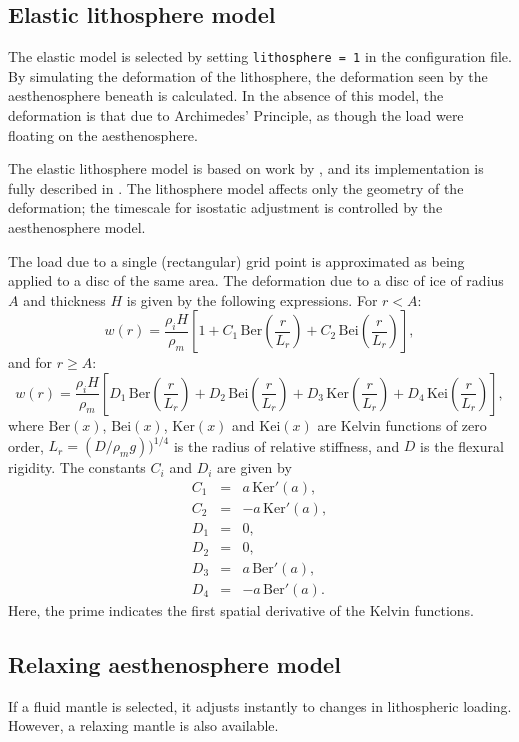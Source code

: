 \subsection{Elastic lithosphere model}
The elastic model is selected by setting \texttt{lithosphere = 1} in the
configuration file. By simulating the deformation of the lithosphere, the
deformation seen by the aesthenosphere beneath is calculated. In the absence of this
model, the deformation is that due to Archimedes' Principle, as though the
load were floating on the aesthenosphere.

The elastic lithosphere model is based on work by \cite{Lambeck1980}, and its
implementation is fully described in \cite{Hagdorn2003}. The lithosphere
model affects only the geometry of the deformation; the timescale for
isostatic adjustment is controlled by the aesthenosphere model. 

The load due to a single (rectangular) grid point is approximated as being
applied to a disc of the same area. The deformation due to a disc of ice of
radius $A$ and thickness $H$ is given by the following expressions. For $r<A$:
\begin{equation} 
w(r)=\frac{\rho_i H}{\rho_m}\left[1+C_1\,\mathrm{Ber}\left(\frac{r}{L_r}\right)+C_2\,\mathrm{Bei}\left(\frac{r}{L_r}\right)\right],
\end{equation}
and for $r\geq A$:
\begin{equation}
w(r)=\frac{\rho_i
  H}{\rho_m}\left[D_1\,\mathrm{Ber}\left(\frac{r}{L_r}\right)+D_2\,\mathrm{Bei}\left(\frac{r}{L_r}\right)
+D_3\,\mathrm{Ker}\left(\frac{r}{L_r}\right)+D_4\,\mathrm{Kei}\left(\frac{r}{L_r}\right)\right],
\end{equation}
where $\mathrm{Ber}(x)$, $\mathrm{Bei}(x)$, $\mathrm{Ker}(x)$ and
$\mathrm{Kei}(x)$ are Kelvin functions of zero order, $L_r=(D/\rho_m
g))^{1/4}$ is the radius of relative stiffness, and $D$ is the flexural
rigidity. The constants $C_i$ and $D_i$ are given by
\begin{equation}
\begin{array}{rcl}
C_1&=&a\,\mathrm{Ker}'(a),\\
C_2&=&-a\,\mathrm{Ker}'(a),\\
D_1&=&0,\\
D_2&=&0,\\
D_3&=&a\,\mathrm{Ber}'(a),\\
D_4&=&-a\,\mathrm{Ber}'(a).
\end{array}
\end{equation}
Here, the prime indicates the first spatial derivative of the Kelvin functions.

\subsection{Relaxing aesthenosphere model}
If a fluid mantle is selected, it adjusts instantly to changes in lithospheric
loading. However, a relaxing mantle is also available.

